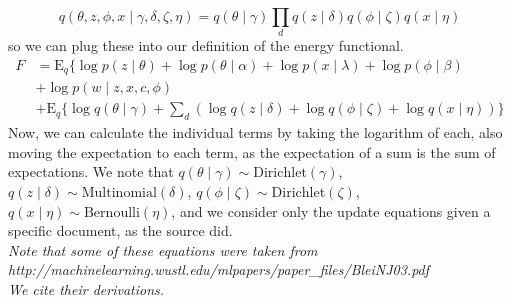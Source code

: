 \documentclass[12pt]{article}
\begin{document}
\begin{equation*}
q(\theta, z, \phi, x \mid \gamma, \delta, \zeta, \eta) = q(\theta \mid \gamma) \prod_d q(z \mid \delta) q(\phi \mid \zeta) q(x \mid \eta)
\end{equation*}
so we can plug these into our definition of the energy functional.
\begin{align*}
F &= \mathrm{E}_q \{\log p(z \mid \theta) + \log p(\theta \mid \alpha) + \log p(x \mid \lambda) + \log p(\phi \mid \beta) \\
&+ \log p(w \mid z, x, c, \phi) \\
&+ \mathrm{E}_q \{ \log q(\theta \mid \gamma) + \sum_d \left( \log q(z \mid \delta) + \log q(\phi \mid \zeta) + \log q(x \mid \eta) \right) \} 
\end{align*}
Now, we can calculate the individual terms by taking the logarithm of each, also moving the expectation to each term, as the expectation of a sum is the sum of expectations.  We note that $q(\theta \mid \gamma) \sim \mathrm{Dirichlet}(\gamma)$, $q(z \mid \delta) \sim \mathrm{Multinomial}(\delta)$, $q(\phi \mid \zeta) \sim \mathrm{Dirichlet}(\zeta)$, $q(x \mid \eta) \sim \mathrm{Bernoulli}(\eta)$, and we consider only the update equations given a specific document, as the source did.\\
\noindent \textit{Note that some of these equations were taken from\\ http://machinelearning.wustl.edu/mlpapers/paper\_files/BleiNJ03.pdf \\ We cite their derivations.}
\end{document}
